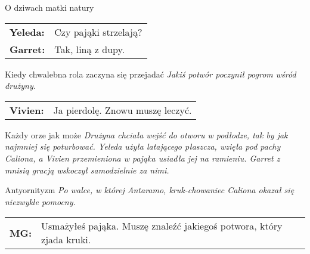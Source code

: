\documentclass[10pt,twoside,twocolumn]{book}
\begin{document}
\begin{rpg-quotebox}{O dziwach matki natury}
   \begin{tabularx}{\columnwidth}{lX}
      \textbf{Yeleda:} & Czy pająki strzelają?\\
      \textbf{Garret:} & Tak, liną z dupy.\\
   \end{tabularx}
\end{rpg-quotebox}


\begin{rpg-quotebox}{Kiedy chwalebna rola zaczyna się przejadać}
   \textit{Jakiś potwór poczynił pogrom wśród drużyny.}\\
   \newline
   \begin{tabularx}{\columnwidth}{lX}
      \textbf{Vivien:} & Ja pierdolę. Znowu muszę leczyć.\\
   \end{tabularx}
\end{rpg-quotebox}


\begin{rpg-quotebox}{Każdy orze jak może}
   \textit{Drużyna chciała wejść do otworu w podłodze, tak by jak najmniej się poturbować. Yeleda użyła latającego płaszcza, wzięła pod pachy Caliona, a Vivien przemieniona w pająka usiadła jej na ramieniu. Garret z mnisią gracją wskoczył samodzielnie za nimi.}\\
\end{rpg-quotebox}


\begin{rpg-quotebox}{Antyornityzm}
   \textit{Po walce, w której Antaramo, kruk-chowaniec Caliona okazał się niezwykle pomocny.}\\
   \newline
   \begin{tabularx}{\columnwidth}{lX}
      \textbf{MG:} & Usmażyłeś pająka. Muszę znaleźć jakiegoś potwora, który zjada kruki.\\
   \end{tabularx}
\end{rpg-quotebox}
\end{document}
